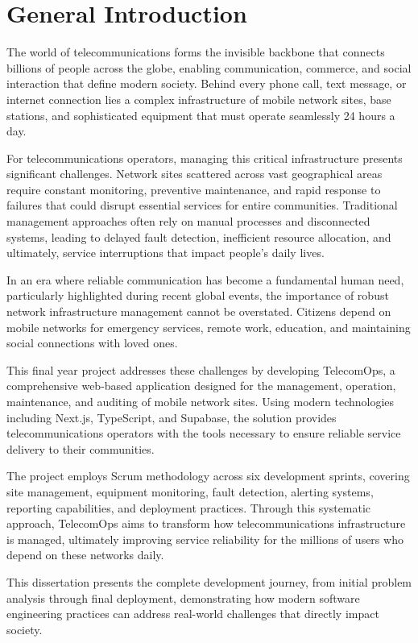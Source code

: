 \chapter*{General Introduction}

The world of telecommunications forms the invisible backbone that connects billions of people across the globe, enabling communication, commerce, and social interaction that define modern society. Behind every phone call, text message, or internet connection lies a complex infrastructure of mobile network sites, base stations, and sophisticated equipment that must operate seamlessly 24 hours a day.

For telecommunications operators, managing this critical infrastructure presents significant challenges. Network sites scattered across vast geographical areas require constant monitoring, preventive maintenance, and rapid response to failures that could disrupt essential services for entire communities. Traditional management approaches often rely on manual processes and disconnected systems, leading to delayed fault detection, inefficient resource allocation, and ultimately, service interruptions that impact people's daily lives.

In an era where reliable communication has become a fundamental human need, particularly highlighted during recent global events, the importance of robust network infrastructure management cannot be overstated. Citizens depend on mobile networks for emergency services, remote work, education, and maintaining social connections with loved ones.

This final year project addresses these challenges by developing TelecomOps, a comprehensive web-based application designed for the management, operation, maintenance, and auditing of mobile network sites. Using modern technologies including Next.js, TypeScript, and Supabase, the solution provides telecommunications operators with the tools necessary to ensure reliable service delivery to their communities.

The project employs Scrum methodology across six development sprints, covering site management, equipment monitoring, fault detection, alerting systems, reporting capabilities, and deployment practices. Through this systematic approach, TelecomOps aims to transform how telecommunications infrastructure is managed, ultimately improving service reliability for the millions of users who depend on these networks daily.

This dissertation presents the complete development journey, from initial problem analysis through final deployment, demonstrating how modern software engineering practices can address real-world challenges that directly impact society.